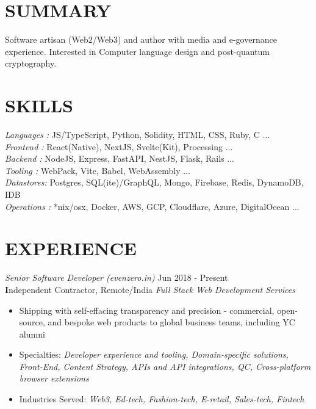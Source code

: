 \documentclass[margin, 10pt]{res} %
\begin{document}
\begin{resume}

\section{\ttfamily SUMMARY}  
Software artisan (Web2/Web3) and author with media and e-governance experience. Interested in Computer language design and post-quantum cryptography.

\section{\ttfamily SKILLS} 

{\sl Languages :} JS/TypeScript, Python, Solidity, HTML, CSS, Ruby, C ...\\
{\sl Frontend :} React(Native), NextJS, Svelte(Kit), Processing  ...\\
{\sl Backend :} NodeJS, Express, FastAPI, NestJS, Flask, Rails ...\\
{\sl Tooling :} WebPack, Vite, Babel, WebAssembly ... \\
{\sl Datastores:} Postgres, SQL(ite)/GraphQL, Mongo, Firebase, Redis, DynamoDB, IDB\\
{\sl Operations :} *nix/osx, Docker, AWS, GCP, Cloudflare, Azure, DigitalOcean ...\\

\section{\ttfamily EXPERIENCE}

{\sl Senior Software Developer (evenzero.in)} \hfill Jun 2018 - \color{Green} Present\color{black}\\
\textbf Independent Contractor, Remote/India \hfill {\scriptsize \it Full Stack Web Development Services}
\begin{itemize}\smallskip\smallskip
\item Shipping with self-effacing transparency and precision - commercial, open-source, and bespoke web products to global business teams, including YC alumni
\item Specialties: {\sl Developer experience and tooling, Domain-specific solutions, Front-End, Content Strategy, APIs and API integrations, QC, Cross-platform browser extensions} 
\item Industries Served: {\sl Web3, Ed-tech, Fashion-tech, E-retail, Sales-tech, Fintech } 


\end{itemize}
\end{resume}
\end{document}
